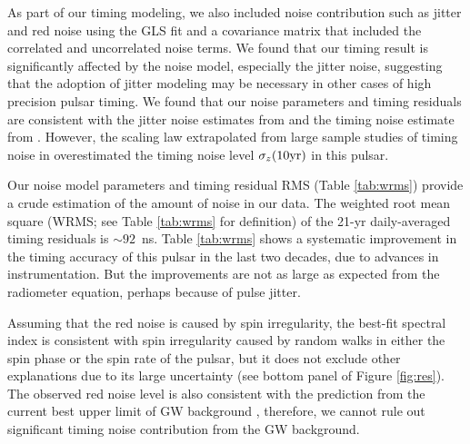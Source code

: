 As part of our timing modeling, we also included noise contribution
such as jitter and red noise
 using the GLS fit and a covariance matrix that included the
correlated and uncorrelated noise terms.
We found that our timing result is significantly affected by the noise
model, especially the jitter noise, suggesting that the adoption of jitter
modeling may be necessary in other cases of high precision pulsar timing. 
We found that our noise parameters and timing residuals are consistent with the jitter
noise estimates from \citet{sc12} and the timing noise estimate from \citet{sc10}. However,
the scaling law extrapolated from large sample studies of timing noise in \citet{hlk10}
overestimated the timing noise level $\sigma_z({\rm 10 yr})$ in this pulsar.

Our noise model parameters and timing residual RMS (Table \ref{tab:wrms})
provide a crude estimation of the amount of noise in our data. The weighted
root mean square (WRMS; see Table \ref{tab:wrms} for definition) of
the 21-yr daily-averaged timing residuals is $\sim 92$~ns. 
Table \ref{tab:wrms} shows a systematic improvement in the timing accuracy of
this pulsar in the last two decades, due to advances in instrumentation.
But the improvements are not as large as expected from the radiometer 
equation, perhaps because of pulse jitter. 

Assuming that the red noise is caused by spin irregularity,
the best-fit spectral index is consistent with
spin irregularity caused by random walks in
either the spin phase or the spin rate of the pulsar, but it does not exclude other explanations
due to its large uncertainty (see bottom panel of Figure \ref{fig:res}).
The observed red noise level is also consistent with the prediction
from the current best upper limit of GW background \citep{src+13}, therefore,
we cannot rule out significant timing noise contribution from the GW background. 


